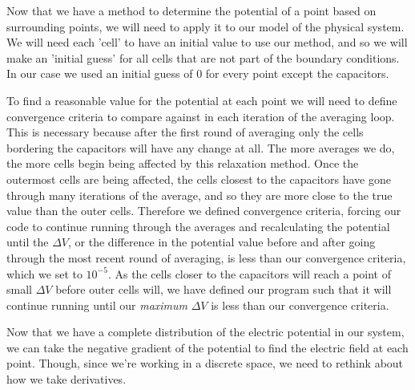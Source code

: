 \documentclass{report}
\begin{document}
            Now that we have a method to determine the potential of a point based on surrounding points, we will need to apply it to our model of the physical system. We will need each 'cell' to have an initial value to use our method, and so we will make an 'initial guess' for all cells that are not part of the boundary conditions. In our case we used an initial guess of $0$ for every point except the capacitors. 
            
            To find a reasonable value for the potential at each point we will need to define convergence criteria to compare against in each iteration of the averaging loop.  This is necessary because after the first round of averaging only the cells bordering the capacitors will have any change at all. The more averages we do, the more cells begin being affected by this relaxation method. Once the outermost cells are being affected, the cells closest to the capacitors have gone through many iterations of the average, and so they are more close to the true value than the outer cells. Therefore we defined convergence criteria, forcing our code to continue running through the averages and recalculating the potential until the $\Delta V$, or the difference in the potential value before and after going through the most recent round of averaging, is less than our convergence criteria, which we set to $10^{-5}$. As the cells closer to the capacitors will reach a point of small $\Delta V$ before outer cells will, we have defined our program such that it will continue running until our \textit{maximum} $\Delta V$ is less than our convergence criteria.
            
            Now that we have a complete distribution of the electric potential in our system, we can take the negative gradient of the potential to find the electric field at each point.  Though, since we're working in a discrete space, we need to rethink about how we take derivatives.
\end{document}
